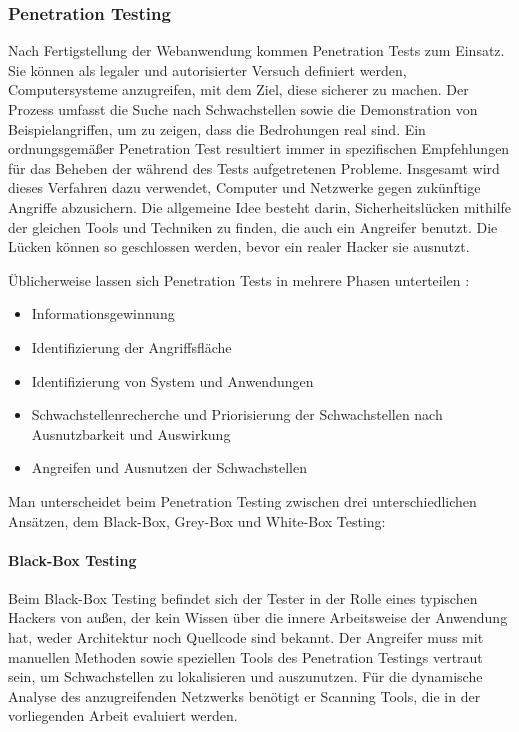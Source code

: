 \documentclass[12pt,oneside,a4paper,parskip,pointlessnumbers]{scrbook}
\begin{document}
    \subsubsection{Penetration Testing}
    Nach Fertigstellung der Webanwendung kommen Penetration Tests zum Einsatz. Sie können als legaler und autorisierter Versuch definiert werden, Computersysteme anzugreifen, mit dem Ziel, diese sicherer zu machen.
    Der Prozess umfasst die Suche nach Schwachstellen sowie die Demonstration von Beispielangriffen, um zu zeigen, dass die Bedrohungen real sind.
    Ein ordnungsgemäßer Penetration Test resultiert immer in spezifischen Empfehlungen für das
    Beheben der während des Tests aufgetretenen Probleme.
    Insgesamt wird dieses Verfahren dazu verwendet, Computer und Netzwerke gegen zukünftige Angriffe abzusichern. Die allgemeine Idee besteht darin, Sicherheitslücken mithilfe der gleichen Tools und Techniken zu finden, die auch ein Angreifer benutzt. Die Lücken können so geschlossen werden, bevor ein realer Hacker sie ausnutzt. \cite{engebretson}

    Üblicherweise lassen sich Penetration Tests in mehrere Phasen unterteilen \cite{BSI}:

    \begin{itemize}
      \item Informationsgewinnung
      \item Identifizierung der Angriffsfläche
      \item Identifizierung von System und Anwendungen
      \item Schwachstellenrecherche und Priorisierung der Schwachstellen nach Ausnutzbarkeit und Auswirkung
      \item Angreifen und Ausnutzen der Schwachstellen
    \end{itemize}

    Man unterscheidet beim Penetration Testing zwischen drei unterschiedlichen Ansätzen, dem Black-Box, Grey-Box und White-Box Testing:
    \paragraph{Black-Box Testing}
    Beim Black-Box Testing befindet sich der Tester in der Rolle eines typischen Hackers von
    außen, der kein Wissen über die innere Arbeitsweise der Anwendung hat, weder Architektur noch
    Quellcode sind bekannt. Der Angreifer muss mit manuellen Methoden sowie speziellen Tools des Penetration Testings vertraut sein, um Schwachstellen zu lokalisieren und auszunutzen. Für die dynamische Analyse des anzugreifenden Netzwerks benötigt er Scanning Tools, die in der vorliegenden Arbeit evaluiert werden.
    \newpage
\end{document}
